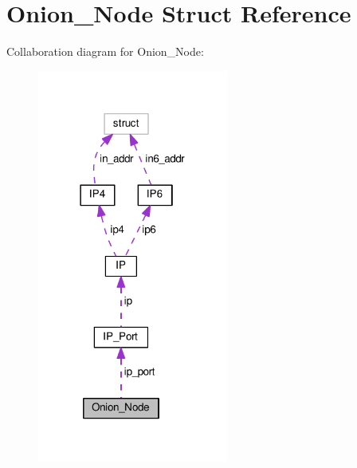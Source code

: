 \hypertarget{struct_onion___node}{\section{Onion\+\_\+\+Node Struct Reference}
\label{struct_onion___node}
}


Collaboration diagram for Onion\+\_\+\+Node\+:
\nopagebreak
\begin{figure}[H]
\begin{center}
\leavevmode
\includegraphics[width=178pt]{struct_onion___node__coll__graph}
\end{center}
\end{figure}
